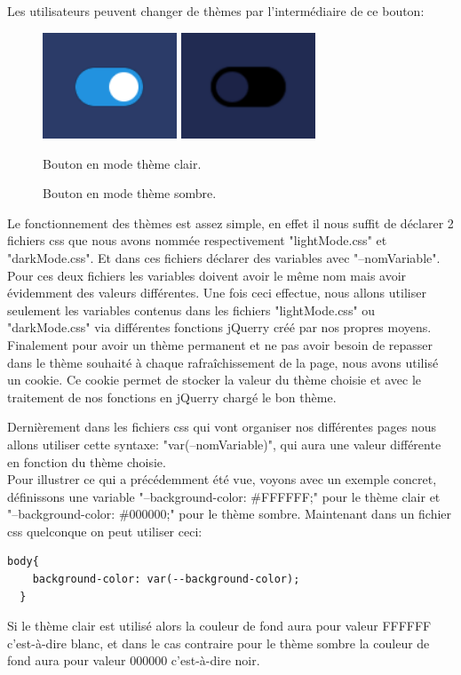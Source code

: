 \documentclass[a4paper,10pt]{article}
\begin{document}
Les utilisateurs peuvent changer de thèmes par l'intermédiaire de ce bouton:
\begin{figure}[!h]
\centerline{
    \includegraphics[width=4cm]{images/boutonThemeClaire.PNG}
    \includegraphics[width=4cm]{images/boutonThemeSombre.PNG}
}
\caption{Bouton en mode thème clair.}
\caption{Bouton en mode thème sombre.}
\label{fig}
\end{figure}

Le fonctionnement des thèmes est assez simple, en effet il nous suffit de déclarer 2 fichiers css que nous avons nommée respectivement "lightMode.css" et "darkMode.css". Et dans ces fichiers déclarer des variables avec "--nomVariable". Pour ces deux fichiers les variables doivent avoir le même nom mais avoir évidemment des valeurs différentes. Une fois ceci effectue, nous allons utiliser seulement les variables contenus dans les fichiers "lightMode.css" ou "darkMode.css" via différentes fonctions jQuerry créé par nos propres moyens. Finalement pour avoir un thème permanent et ne pas avoir besoin de repasser dans le thème souhaité à chaque rafraîchissement de la page, nous avons utilisé un cookie. Ce cookie permet de stocker la valeur du thème choisie et avec le traitement de nos fonctions en jQuerry chargé le bon thème.

Dernièrement dans les fichiers css qui vont organiser nos différentes pages nous allons utiliser cette syntaxe: "var(--nomVariable)", qui aura une valeur différente en fonction du thème choisie.\\

Pour illustrer ce qui a précédemment été vue, voyons avec un exemple concret, définissons une variable "--background-color: \#FFFFFF;" pour le thème clair et "--background-color: \#000000;" pour le thème sombre. Maintenant dans un fichier css quelconque on peut utiliser ceci:
\begin{lstlisting}[language=HTML]
  body{
    background-color: var(--background-color);
  }
\end{lstlisting}
Si le thème clair est utilisé alors la couleur de fond aura pour valeur FFFFFF c'est-à-dire blanc, et dans le cas contraire pour le thème sombre la couleur de fond aura pour valeur 000000 c'est-à-dire noir.
\end{document}

